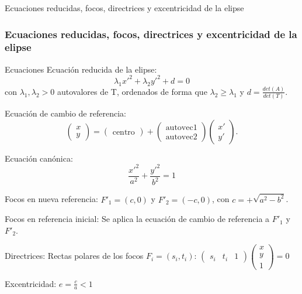 \documentclass[xcolor={dvipsnames},aspectratio=169,10pt]{beamer}
\begin{document}
\begin{frame}{Ecuaciones reducidas, focos, directrices y excentricidad de la elipse}
  \frametitle{Ecuaciones reducidas, focos, directrices y excentricidad de la elipse}
  \begin{block}{Ecuaciones}
    Ecuación reducida de la elipse:
    \[\lambda_1x'^2 + \lambda_2y'^2 + d = 0\]
    con $\lambda_1, \lambda_2 > 0$ autovalores de T, ordenados de forma que $\lambda_2 \geq \lambda_1$ y $d = \frac{det(A)}{det(T)}$.
    
    Ecuación de cambio de referencia:
    \[\begin{pmatrix} x \\ y \end{pmatrix} = \begin{pmatrix} \text{centro} \end{pmatrix} + \begin{pmatrix} \text{autovec1} \\ \text{autovec2} \end{pmatrix} \begin{pmatrix} x' \\ y' \end{pmatrix}.\]
    
    Ecuación canónica:
    \[\frac{x'^2}{a^2} + \frac{y'^2}{b^2} = 1\]
    
    Focos en nueva referencia: $F'_1 = (c, 0)$ y $F'_2 = (-c, 0)$, con $c = +\sqrt{a^2 - b^2}$.
    
    Focos en referencia inicial: Se aplica la ecuación de cambio de referencia a $F'_1$ y $F'_2$.
    
    Directrices: Rectas polares de los focos $F_i = (s_i, t_i)$: $\begin{pmatrix} s_i & t_i & 1 \end{pmatrix} \begin{pmatrix} x \\ y \\ 1 \end{pmatrix} = 0$
    
    Excentricidad: $e = \frac{c}{a} < 1$
  \end{block}
\end{frame}
\end{document}

